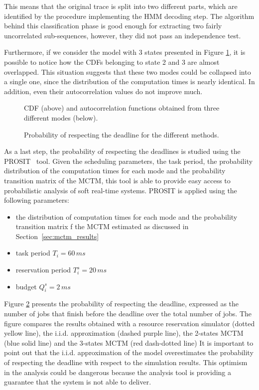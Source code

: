 This means that the original trace is split into two different parts, which
are identified by the procedure implementing the HMM decoding step. The algorithm
behind this classification phase is good enough for extracting two fairly
uncorrelated sub-sequences, however, they did not pass an independence test.

Furthermore, if we consider the model with 3 states presented in Figure
\ref{img:mctm_3_states}, it is possible to notice how the CDFs belonging to state
2 and 3 are almost overlapped. This situation suggests that these two
modes could be collapsed into a single one, since the distribution of the
computation times is nearly identical. In addition, even their autocorrelation
values do not improve much.
\begin{figure}[!htb]
    \caption{CDF (above) and autocorrelation functions obtained from three
        different modes (below).}
    \label{img:mctm_3_states}
\end{figure}

\begin{figure}[!htb]
    \caption{Probability of respecting the deadline for the different methods.}
    \label{img:deadline_comparison}
\end{figure}

As a last step, the probability of respecting the deadlines is studied using the
PROSIT~\cite{palopoli2014tool} tool. Given the scheduling parameters, the task period, the
probability distribution of the computation times for each mode and the probability transition matrix of the MCTM, this tool is able to provide easy
access to probabilistic analysis of soft real-time systems. PROSIT is applied using
the following parameters:
\begin{itemize}
    \item the distribution of computation times for each mode and the probability transition matrix f the MCTM estimated as discussed in Section~\ref{sec:mctm_results}
    \item task period \( T_i = 60\,ms \)
    \item reservation period \( T_{i}^s = 20\,ms \)
    \item budget \( Q_{i}^s = 2\,ms \)
\end{itemize}

Figure \ref{img:deadline_comparison} presents the probability of respecting the deadline, expressed as the number of jobs that finish before the deadline over the total number of jobs. The figure compares the results obtained with a resource reservation simulator (dotted yellow line), the i.i.d.
approximation (dashed purple line), the 2-states MCTM (blue solid line) and the 3-states MCTM (red dash-dotted line) It is important to point out that the i.i.d. approximation of the model overestimates the probability of respecting
the deadline with respect to the simulation results. This optimism in the analysis could be dangerous because the analysis tool is providing a guarantee that the system is not able to deliver.


